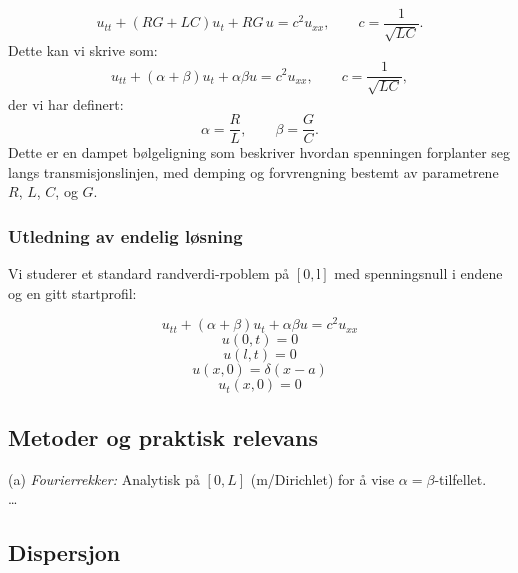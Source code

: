 \begin{equation}
    u_{tt} + (RG + LC)u_t + RG\,u = c^2 u_{xx}, \qquad c = \frac{1}{\sqrt{LC}} .
\end{equation}
Dette kan vi skrive som:
\begin{equation}
    u_{tt} + (\alpha + \beta)u_t + \alpha \beta u = c^2 u_{xx}, \qquad c = \frac{1}{\sqrt{LC}} ,
\end{equation}
der vi har definert:
\begin{equation}
    \alpha = \frac{R}{L}, \qquad \beta = \frac{G}{C} .
\end{equation}
Dette er en dampet bølgeligning som beskriver hvordan spenningen forplanter seg langs transmisjonslinjen, med demping og forvrengning bestemt av parametrene $R$, $L$, $C$, og $G$.




\subsubsection{Utledning av endelig løsning}
Vi studerer et standard randverdi-rpoblem på $[0,\mathrm{l}]$ med spenningsnull i endene og en gitt startprofil:

\begin{equation}
    u_{tt} + (\alpha + \beta)u_t + \alpha \beta u = c^2 u_{xx}
\end{equation}
\begin{equation}
    u(0,t) = 0
\end{equation}
\begin{equation}
    u(l,t) = 0
\end{equation}
\begin{equation}
    u(x,0) = \delta(x - a)
\end{equation}
\begin{equation}
    u_t(x,0) = 0
\end{equation}








\subsection{Metoder og praktisk relevans}

(a) \textit{Fourierrekker:} Analytisk på $[0,L]$ (m/Dirichlet) for å vise $\alpha=\beta$-tilfellet.\\
\dots
\clearpage
\subsection{Dispersjon}


